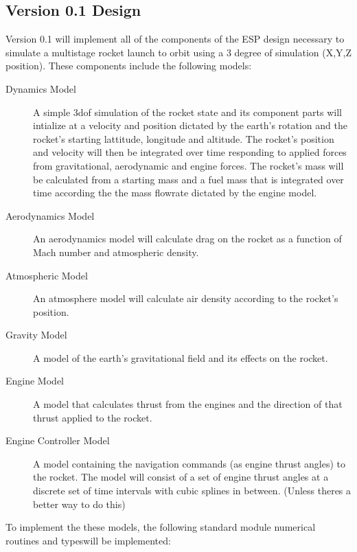 \documentclass{article}
\begin{document}
\subsection{Version 0.1 Design}
Version 0.1 will implement all of the components of the ESP design necessary to simulate a multistage rocket launch to orbit using a 3 degree of simulation (X,Y,Z position). These components include the following models:
\begin{description}
	\item[Dynamics Model] A simple 3dof simulation of the rocket state and its component parts will intialize at a velocity  and position dictated by the earth's rotation and the rocket's starting lattitude, longitude and altitude. The rocket's position and velocity will then be integrated over time responding to applied forces from gravitational, aerodynamic and engine forces. The rocket's mass will be calculated from a starting mass and a fuel mass that is integrated over time according the the mass flowrate dictated by the engine model.
	\item[Aerodynamics Model] An aerodynamics model will calculate drag on the rocket as a function of Mach number and atmospheric density.
	\item[Atmospheric Model] An atmosphere model will calculate air density according to the rocket's position.
	\item[Gravity Model] A model of the earth's gravitational field and its effects on the rocket.
	\item[Engine Model] A model that calculates thrust from the engines and the direction of that thrust applied to the rocket.
	\item[Engine Controller Model] A model containing the navigation commands (as engine thrust angles) to the rocket. The model will  consist of a set of engine thrust angles at a discrete set of time intervals with cubic splines in between. (Unless theres a better way to do this)
\end{description}
To implement the these models, the following standard module numerical routines and typeswill be implemented:
\end{document}
